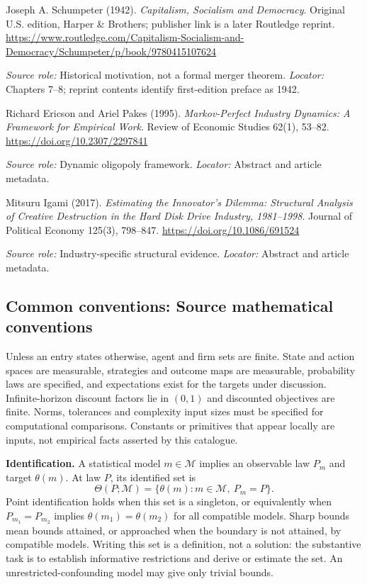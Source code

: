 \documentclass[11pt,a4paper]{article}
\begin{document}
\begin{enumerate}[label={[S\arabic*]},leftmargin=*]

\item Joseph A. Schumpeter (1942). \emph{Capitalism, Socialism and Democracy}. Original U.S. edition, Harper \& Brothers; publisher link is a later Routledge reprint. \url{https://www.routledge.com/Capitalism-Socialism-and-Democracy/Schumpeter/p/book/9780415107624}\par \textit{Source role:} Historical motivation, not a formal merger theorem. \textit{Locator:} Chapters 7--8; reprint contents identify first-edition preface as 1942.

\item Richard Ericson and Ariel Pakes (1995). \emph{Markov-Perfect Industry Dynamics: A Framework for Empirical Work}. Review of Economic Studies 62(1), 53--82. \url{https://doi.org/10.2307/2297841}\par \textit{Source role:} Dynamic oligopoly framework. \textit{Locator:} Abstract and article metadata.

\item Mitsuru Igami (2017). \emph{Estimating the Innovator's Dilemma: Structural Analysis of Creative Destruction in the Hard Disk Drive Industry, 1981--1998}. Journal of Political Economy 125(3), 798--847. \url{https://doi.org/10.1086/691524}\par \textit{Source role:} Industry-specific structural evidence. \textit{Locator:} Abstract and article metadata.

\end{enumerate}

\subsection*{Common conventions: Source mathematical conventions}

Unless an entry states otherwise, agent and firm sets are finite. State and action spaces are measurable, strategies and outcome maps are measurable, probability laws are specified, and expectations exist for the targets under discussion. Infinite-horizon discount factors lie in $(0,1)$ and discounted objectives are finite. Norms, tolerances and complexity input sizes must be specified for computational comparisons. Constants or primitives that appear locally are inputs, not empirical facts asserted by this catalogue.

\textbf{Identification.} A statistical model $m\in\mathcal M$ implies an observable law $P_m$ and target $\theta(m)$. At law $P$, its identified set is
\[
\Theta(P;\mathcal M)=\{\theta(m):m\in\mathcal M,\ P_m=P\}.
\]
Point identification holds when this set is a singleton, or equivalently when $P_{m_1}=P_{m_2}$ implies $\theta(m_1)=\theta(m_2)$ for all compatible models. Sharp bounds mean bounds attained, or approached when the boundary is not attained, by compatible models. Writing this set is a definition, not a solution: the substantive task is to establish informative restrictions and derive or estimate the set. An unrestricted-confounding model may give only trivial bounds.
\end{document}
